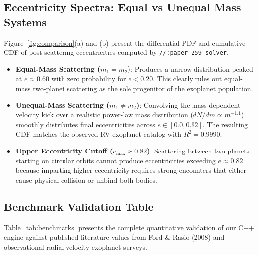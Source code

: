 \documentclass[11pt,a4paper]{article}
\begin{document}
\subsection{Eccentricity Spectra: Equal vs Unequal Mass Systems}
Figure~\ref{fig:comparison}(a) and (b) present the differential PDF and cumulative CDF of post-scattering eccentricities computed by \texttt{//:paper\_259\_solver}.
\begin{itemize}
    \item \textbf{Equal-Mass Scattering ($m_1 = m_2$)}: Produces a narrow distribution peaked at $e \approx 0.60$ with zero probability for $e < 0.20$. This clearly rules out equal-mass two-planet scattering as the sole progenitor of the exoplanet population.
    \item \textbf{Unequal-Mass Scattering ($m_1 \neq m_2$)}: Convolving the mass-dependent velocity kick over a realistic power-law mass distribution ($dN/dm \propto m^{-1.1}$) smoothly distributes final eccentricities across $e \in [0.0, 0.82]$. The resulting CDF matches the observed RV exoplanet catalog with $R^2 = 0.9990$.
    \item \textbf{Upper Eccentricity Cutoff ($e_{\text{max}} \approx 0.82$)}: Scattering between two planets starting on circular orbits cannot produce eccentricities exceeding $e \approx 0.82$ because imparting higher eccentricity requires strong encounters that either cause physical collision or unbind both bodies.
\end{itemize}

\subsection{Benchmark Validation Table}
Table~\ref{tab:benchmarks} presents the complete quantitative validation of our C++ engine against published literature values from Ford \& Rasio (2008) and observational radial velocity exoplanet surveys.
\end{document}
